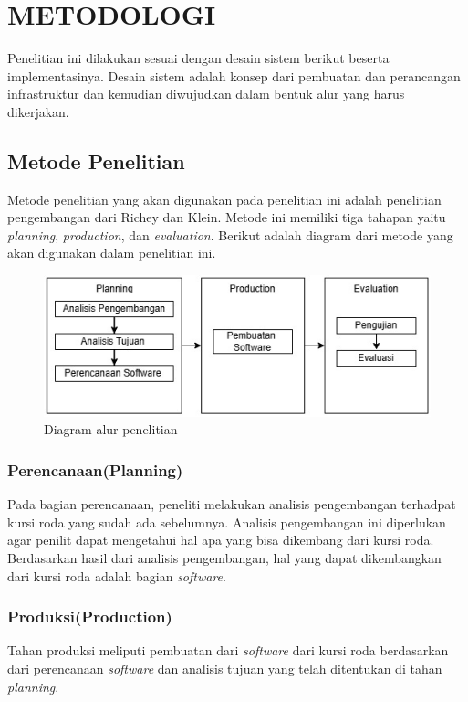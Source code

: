 \chapter{METODOLOGI}
Penelitian ini dilakukan sesuai dengan desain sistem berikut beserta implementasinya. Desain sistem adalah konsep dari pembuatan dan perancangan infrastruktur dan kemudian diwujudkan dalam bentuk alur yang harus dikerjakan.

\section{Metode Penelitian}
Metode penelitian yang akan digunakan pada penelitian ini adalah penelitian pengembangan dari Richey dan Klein\cite{Sugiyono2019}. Metode ini memiliki tiga tahapan yaitu \emph{planning}, \emph{production}, dan \emph{evaluation}. Berikut adalah diagram dari metode yang akan digunakan dalam penelitian ini.
\begin{figure} [H] \centering
  \includegraphics[scale=0.6]{gambar/metodologi penelitian.jpg}
  \caption{Diagram alur penelitian}
  \label{fig:Metode penelitian }
\end{figure}
\subsection{Perencanaan(Planning)}
Pada bagian perencanaan, peneliti melakukan analisis pengembangan terhadpat kursi roda yang sudah ada sebelumnya. Analisis pengembangan ini diperlukan agar penilit dapat mengetahui hal apa yang bisa dikembang dari kursi roda. Berdasarkan hasil dari analisis pengembangan, hal yang dapat dikembangkan dari kursi roda adalah bagian \emph{software}.
\subsection{Produksi(Production)}
Tahan produksi meliputi pembuatan dari \emph{software} dari kursi roda berdasarkan dari perencanaan \emph{software} dan analisis tujuan yang telah ditentukan di tahan \emph{planning}.
